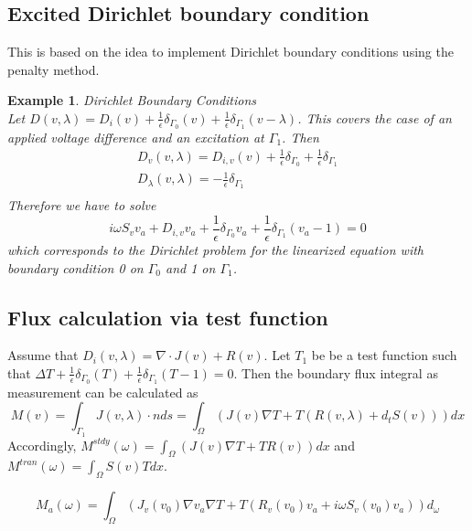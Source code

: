 \documentclass[12pt]{amsproc}
\newtheorem{example}{Example}
\begin{document}
\subsection{Excited Dirichlet boundary condition}
This is based on the idea to implement Dirichlet boundary conditions using the
penalty method.
\begin{example}{Dirichlet Boundary Conditions}\\
  Let $D(v,\lambda)= D_i(v)
  +\frac1\epsilon\delta_{\Gamma_0}(v)
  +\frac1\epsilon\delta_{\Gamma_1}(v-\lambda)$. This covers the case of an
  applied voltage difference and an excitation at $\Gamma_1$.
Then  
\begin{equation*}
  \begin{split}
    D_v(v,\lambda)= D_{i,v}(v)+ \frac1\epsilon\delta_{\Gamma_0}+ \frac1\epsilon\delta_{\Gamma_1}\\
    D_\lambda(v,\lambda)= -\frac1\epsilon\delta_{\Gamma_1}\\
   \end{split}
\end{equation*}
Therefore we have to solve 
\begin{equation*}
  i\omega S_v v_a + D_{i,v} v_a +\frac1\epsilon\delta_{\Gamma_0}v_a +\frac1\epsilon\delta_{\Gamma_1}(v_a-1) =0
\end{equation*}
which corresponds to the Dirichlet problem  for the linearized equation 
with boundary condition 0 on $\Gamma_0$ and 1 on $\Gamma_1$.
\end{example}

\subsection{Flux calculation via test function}
Assume that $D_i(v,\lambda) = \nabla \cdot J(v) + R(v)$. Let $T_1$ be be a test function
such that $\Delta T    +\frac1\epsilon\delta_{\Gamma_0}(T)
+\frac1\epsilon\delta_{\Gamma_1}(T-1)=0$.
Then the boundary flux integral as measurement can be calculated as 
$$M(v)=\int_{\Gamma_1} J(v,\lambda)\cdot n ds=  \int_\Omega \left(J(v) \nabla T + T (R(v,\lambda) + d_t S(v))\right) dx$$
Accordingly, $M^{stdy}(\omega)=\int_\Omega \left(J(v) \nabla T + T R(v)\right) dx$ and
  $M^{tran}(\omega) = \int_{\Omega} S(v) T dx$.

$$M_a(\omega)= \int_\Omega \left(J_v(v_0)\nabla v_a \nabla T + T (R_v(v_0)v_a + i\omega S_v(v_0)v_a)\right) d_\omega$$
\end{document}
